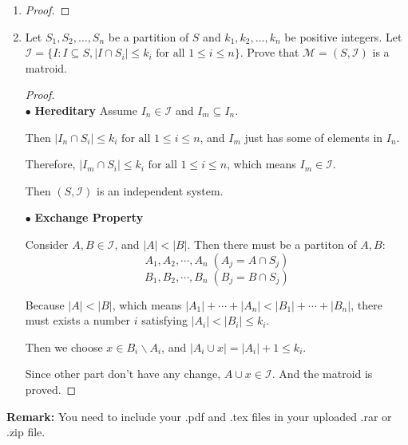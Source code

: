 \documentclass[12pt,a4paper]{article}
\makeatletter
\newtheorem*{solution}{Solution}
\theoremstyle{definition}
\renewenvironment{solution}[1][Solution] {\par\pushQED{\qed}\normalfont\topsep6\p@\@plus6\p@\relax\trivlist\item[\hskip\labelsep\bfseries#1\@addpunct{.}]\ignorespaces}{\popQED\endtrivlist\@endpefalse} \makeatother
\makeatother
\begin{document}
\begin{enumerate}
\begin{solution}
\begin{proof}
    	
    	
    	
    	
    	 
    \end{proof}
    

    \end{solution}

    \item
    Let $S_1,S_2,\dots,S_n$ be a partition of $S$ and $k_1,k_2,\dots,k_n$ be positive integers. Let $\mathcal{I}=\{I: I \subseteq S,|I \cap S_i| \leq k_i \text { for all } 1 \leq i \leq n\}$. Prove that $\mathcal{M}=(S,\mathcal{I})$ is a matroid.

   \begin{proof}
   ~\\
   $\bullet$ \textbf{Hereditary} Assume  $I_n \in \mathcal{I}$ and $ I_m \subseteq I_n$.
   
    Then $|I_n \cap S_i| \leq k_i \text { for all } 1 \leq i \leq n$, and $I_m$ just has some of elements in $I_n   $.
   
   
   Therefore, $|I_m \cap S_i| \leq k_i \text { for all } 1 \leq i \leq n$, which means  $I_m \in \mathcal{I}$. 
   
   Then $(S,\mathcal{I})$ is an independent system.
   
    $\bullet$ \textbf{Exchange Property}
    
    Consider $A,B\in \mathcal{I}$, and $|A|<|B|$. Then there must be a partiton of $A,B$: $$A_1,A_2,\cdots,A_n\; (A_j=A\cap S_j)$$
    $$B_1,B_2,\cdots,B_n\; (B_j=B\cap S_j)$$
    
    Because $|A|<|B|$, which means $|A_1|+\cdots+|A_n|<|B_1|+\cdots+|B_n|$, there must exists a number $i$ satisfying $|A_i|<|B_i|\leq k_i$.
    
    Then we choose $x \in B_i\backslash A_i$, and $|A_i\cup {x}|=|A_i|+1\leq k_i$.
    
    Since other part don't have any change, $A \cup {x} \in \mathcal{I}$. And the matroid is proved.  
    
     
   
    \end{proof}

\end{enumerate}

\vspace{20pt}

\textbf{Remark:} You need to include your .pdf and .tex files in your uploaded .rar or .zip file.

\end{document}

